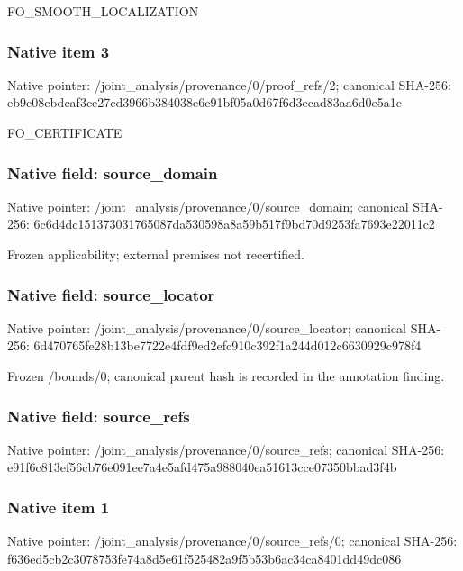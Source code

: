 \documentclass[10pt,a4paper]{article}
\begin{document}
\begingroup\raggedright\sloppy FO\_\allowbreak{}SMOOTH\_\allowbreak{}LOCALIZATION\par\endgroup

\subsubsection{Native item 3}
Native pointer: /joint\_\allowbreak{}analysis/provenance/0/proof\_\allowbreak{}refs/2; canonical SHA-256: eb9c08cbdcaf3ce27cd3966b384038e6e91bf05a0d67f6d3ecad83aa6d0e5a1e

\begingroup\raggedright\sloppy FO\_\allowbreak{}CERTIFICATE\par\endgroup

\subsubsection{Native field: source\_\allowbreak{}domain}
Native pointer: /joint\_\allowbreak{}analysis/provenance/0/source\_\allowbreak{}domain; canonical SHA-256: 6c6d4dc151373031765087da530598a8a59b517f9bd70d9253fa7693e22011c2

\begingroup\raggedright\sloppy Frozen applicability;\allowbreak{} external premises not recertified.\par\endgroup

\subsubsection{Native field: source\_\allowbreak{}locator}
Native pointer: /joint\_\allowbreak{}analysis/provenance/0/source\_\allowbreak{}locator; canonical SHA-256: 6d470765fe28b13be7722e4fdf9ed2efc910c392f1a244d012c6630929c978f4

\begingroup\raggedright\sloppy Frozen /\allowbreak{}bounds/\allowbreak{}0;\allowbreak{} canonical parent hash is recorded in the annotation finding.\par\endgroup

\subsubsection{Native field: source\_\allowbreak{}refs}
Native pointer: /joint\_\allowbreak{}analysis/provenance/0/source\_\allowbreak{}refs; canonical SHA-256: e91f6c813ef56cb76e091ee7a4e5afd475a988040ea51613cce07350bbad3f4b

\subsubsection{Native item 1}
Native pointer: /joint\_\allowbreak{}analysis/provenance/0/source\_\allowbreak{}refs/0; canonical SHA-256: f636ed5cb2c3078753fe74a8d5e61f525482a9f5b53b6ac34ca8401dd49dc086
\end{document}
